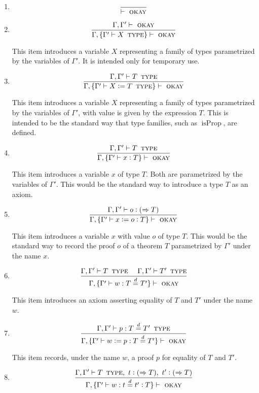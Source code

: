 \documentclass[11pt]{article}
\newcommand{\eqd}{\stackrel{d}{=}}
\newcommand{\spc}{{\,\,\,\,\,\,\,}}
\newcommand{\ccolon}[1]{\vcentcolon#1}
\newcommand{\synth}[1]{\vcentcolon(\Rightarrow#1)} %
\newcommand{\Type}{\mathop{\text{ \sc type}}}
\newcommand{\Okay}{\mathop{\text{ \sc okay}}}
\newcommand{\defn}{\vcentcolon=}
\begin{document}
\begin{enumerate}

\item
$$\frac{}{\vdash\Okay}$$

\item
$$\frac{\Gamma,\Gamma'\vdash \Okay}{\Gamma,\{\Gamma' \vdash X \Type \} \vdash\Okay}$$

This item introduces a variable $X$ representing a family of types parametrized by
the variables of $\Gamma'$.  It is intended only for temporary use.

\item
$$\frac{\Gamma,\Gamma'\vdash T \Type }{\Gamma,\{\Gamma' \vdash X \defn T \Type \} \vdash\Okay}$$

This item introduces a variable $X$ representing a family of types parametrized by
the variables of $\Gamma'$, with value is given by the expression $T$.  This is
intended to be the standard way that type families, such as $\mathop{isProp}$,
are defined.

\item
$$\frac{\Gamma,\Gamma'\vdash T \Type}{\Gamma,\{\Gamma' \vdash x \ccolon{T} \} \vdash\Okay}$$

This item introduces a variable $x$ of type $T$.  Both are parametrized by the
variables of $\Gamma'$.  This would be the standard way to introduce a type $T$
as an axiom.

\item
$$\frac{\Gamma,\Gamma'\vdash o \synth T}{\Gamma,\{\Gamma' \vdash x \defn o \ccolon{T} \} \vdash\Okay}$$

This item introduces a variable $x$ with value $o$ of type $T$. This would be
the standard way to record the proof $o$ of a theorem $T$ parametrized by
$\Gamma'$ under the name $x$.

\item
$$\frac{\Gamma,\Gamma'\vdash T \Type \spc \Gamma,\Gamma'\vdash T' \Type}{\Gamma,\{\Gamma' \vdash w : T \eqd T' \} \vdash\Okay}$$

This item introduces an axiom asserting equality of $T$ and $T'$ under the name $w$.

\item
$$\frac{\Gamma,\Gamma'\vdash p : T \eqd T' \Type}{\Gamma,\{\Gamma' \vdash w \defn p : T \eqd T' \} \vdash\Okay}$$

This item records, under the name $w$, a proof $p$ for equality of $T$ and $T'$.

\item
$$\frac{\Gamma,\Gamma'\vdash T \Type,~ t \synth{T},~ t' \synth{T}}{\Gamma,\{\Gamma' \vdash w : t \eqd t' \ccolon{T} \} \vdash\Okay}$$


\end{enumerate}
\end{document}
